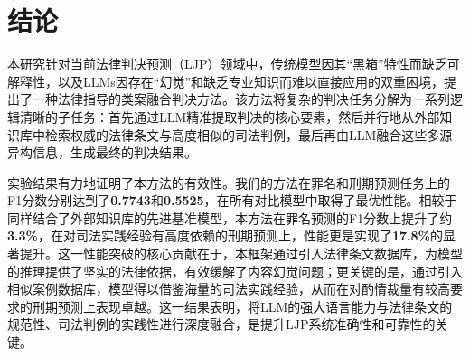 
\section{\heiti 结论}
本研究针对当前法律判决预测（LJP）领域中，传统模型因其“黑箱”特性而缺乏可解释性，以及LLMs因存在“幻觉”和缺乏专业知识而难以直接应用的双重困境，提出了一种法律指导的类案融合判决方法。该方法将复杂的判决任务分解为一系列逻辑清晰的子任务：首先通过LLM精准提取判决的核心要素，然后并行地从外部知识库中检索权威的法律条文与高度相似的司法判例，最后再由LLM融合这些多源异构信息，生成最终的判决结果。

实验结果有力地证明了本方法的有效性。我们的方法在罪名和刑期预测任务上的F1分数分别达到了\textbf{0.7743}和\textbf{0.5525}，在所有对比模型中取得了最优性能。相较于同样结合了外部知识库的先进基准模型，本方法在罪名预测的F1分数上提升了约\textbf{3.3\%}，在对司法实践经验有高度依赖的刑期预测上，性能更是实现了\textbf{17.8\%}的显著提升。这一性能突破的核心贡献在于，本框架通过引入法律条文数据库，为模型的推理提供了坚实的法律依据，有效缓解了内容幻觉问题；更关键的是，通过引入相似案例数据库，模型得以借鉴海量的司法实践经验，从而在对酌情裁量有较高要求的刑期预测上表现卓越。这一结果表明，将LLM的强大语言能力与法律条文的规范性、司法判例的实践性进行深度融合，是提升LJP系统准确性和可靠性的关键。